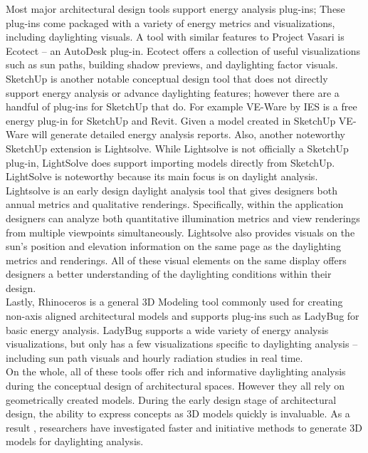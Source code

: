 	Most major architectural design tools support energy analysis plug-ins; These plug-ins come packaged with a variety of energy metrics and visualizations, including daylighting visuals.
	A tool with similar features to Project Vasari is Ecotect -- an AutoDesk plug-in\cite{ecotect}.
	Ecotect offers a collection of useful visualizations such as sun paths, building shadow previews, and daylighting factor visuals. \\

	SketchUp is another notable conceptual design tool that does not directly support energy analysis or advance daylighting features\cite{sketchup}; however there are a handful of plug-ins for SketchUp that do.
	For example VE-Ware by IES is a free energy plug-in for SketchUp and Revit\cite{veware}. 
	Given a model created in SketchUp VE-Ware will generate detailed energy analysis reports.
	Also, another noteworthy SketchUp extension is Lightsolve\cite{andersen2008intuitive}.
	While Lightsolve is not officially a SketchUp plug-in, LightSolve does support importing models directly from SketchUp.
	LightSolve is noteworthy because its main focus is on daylight analysis.
	Lightsolve is an early design daylight analysis tool that gives designers both annual metrics and qualitative renderings.
	Specifically, within the application designers can analyze both quantitative illumination metrics and view renderings from multiple viewpoints simultaneously.
	Lightsolve also provides visuals on the sun's position and elevation information on the same page as the daylighting metrics and renderings. 
	All of these visual elements on the same display offers designers a better understanding of the daylighting conditions within their design\cite{andersen2011informing}. \\

	Lastly, Rhinoceros is a general 3D Modeling tool commonly used for creating non-axis aligned architectural models and supports plug-ins such as LadyBug for basic energy analysis\cite{rhino,ladybug}.
	LadyBug supports a wide variety of energy analysis visualizations, but only has a few visualizations specific to daylighting analysis -- including sun path visuals and hourly radiation studies in real time. \\

	On the whole, all of these tools offer rich and informative daylighting analysis during the conceptual  design of architectural spaces.
	However they all rely on geometrically created models.
	During the early design stage of architectural design, the ability to express concepts as 3D models quickly is invaluable.
	As a result , researchers have investigated faster and initiative methods to generate 3D models for daylighting analysis.
	
